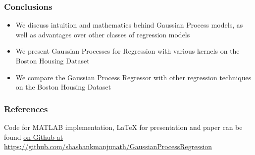 \documentclass[pdf]{beamer}
\begin{document}
\begin{frame}
  \frametitle{Conclusions}
  \begin{itemize}
    \item We discuss intuition and mathematics behind Gaussian Process models, as well as advantages over other classes
      of regression models
    \item We present Gaussian Processes for Regression with various kernels on the Boston Housing Dataset
    \item We compare the Gaussian Process Regressor with other regression techniques on the Boston Housing Dataset
  \end{itemize}
\end{frame}

\begin{frame}[shrink=30]
  \frametitle{References}
  
  

  Code for MATLAB implementation, LaTeX for presentation and paper can be found
  \href{https://github.com/shashankmanjunath/GaussianProcessRegression}{on Github at
  https://github.com/shashankmanjunath/GaussianProcessRegression}

\end{frame}
\end{document}

